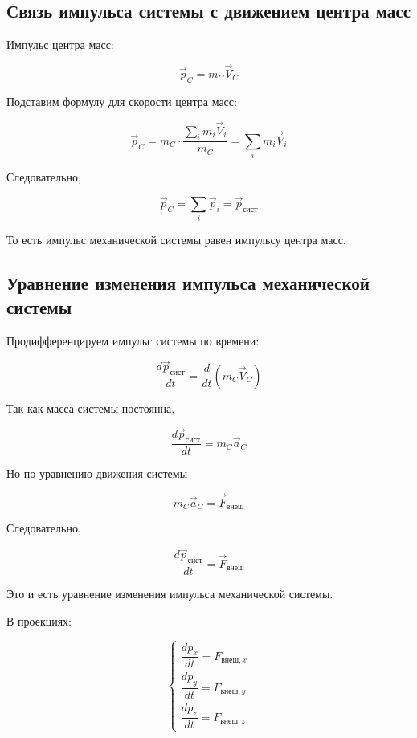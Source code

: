 \documentclass[a4paper,12pt]{article}
\begin{document}
\vspace{0.8em}

\subsection*{Связь импульса системы с движением центра масс}

Импульс центра масс:

\[
\vec p_C
=
m_C \vec V_C
\]

Подставим формулу для скорости центра масс:

\[
\vec p_C
=
m_C \cdot \frac{\sum_i m_i \vec V_i}{m_C}
=
\sum_i m_i \vec V_i
\]


Следовательно,

\[
\vec p_C
=
\sum_i \vec p_i
=
\vec p_{\text{сист}}
\]

То есть импульс механической системы равен импульсу центра масс.

\vspace{0.8em}

\subsection*{Уравнение изменения импульса механической системы}

Продифференцируем импульс системы по времени:

\[
\frac{d\vec p_{\text{сист}}}{dt}
=
\frac{d}{dt}\left(m_C \vec V_C\right)
\]

Так как масса системы постоянна,

\[
\frac{d\vec p_{\text{сист}}}{dt}
=
m_C \vec a_C
\]

Но по уравнению движения системы

\[
m_C \vec a_C
=
\vec F_{\text{внеш}}
\]

Следовательно,

\[
\frac{d\vec p_{\text{сист}}}{dt}
=
\vec F_{\text{внеш}}
\]

Это и есть уравнение изменения импульса механической системы.

В проекциях:

\[
\begin{cases}
\dfrac{dp_x}{dt} = F_{\text{внеш},x} \\
\dfrac{dp_y}{dt} = F_{\text{внеш},y} \\
\dfrac{dp_z}{dt} = F_{\text{внеш},z}
\end{cases}
\]

\vspace{0.8em}
\end{document}
